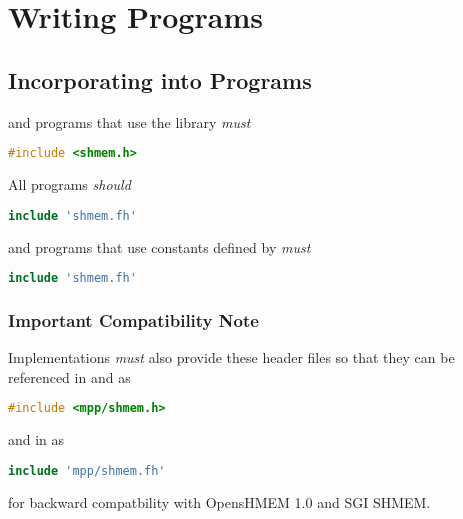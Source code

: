 \section{Writing \openshmem{} Programs}

\subsection{Incorporating \openshmem{} into Programs}


\Clang{} and \Cpp{} programs that use the \openshmem library \emph{must}

\begin{lstlisting}[language=C++]
#include <shmem.h>
\end{lstlisting}

All \Fortran{} \openshmem programs \emph{should}

\begin{lstlisting}[language=Fortran]
include 'shmem.fh'
\end{lstlisting}

and \Fortran{} \openshmem programs that use constants defined by \openshmem
\emph{must}

\begin{lstlisting}[language=Fortran]
include 'shmem.fh'
\end{lstlisting}

\subsubsection{\textbf{Important Compatibility Note}}

Implementations \emph{must} also provide these header files so that
they can be referenced in \Clang{} and \Cpp{} as

\begin{lstlisting}[language=C++]
#include <mpp/shmem.h>
\end{lstlisting}

and in \Fortran{} as

\begin{lstlisting}[language=Fortran]
include 'mpp/shmem.fh'
\end{lstlisting}

for backward compatbility with OpensHMEM 1.0 and SGI SHMEM.

